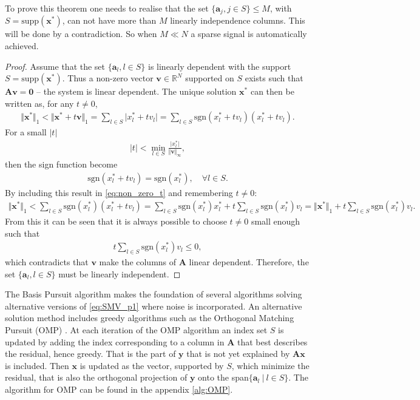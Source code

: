 To prove this theorem one needs to realise that the set $\lbrace \mathbf{a}_j, j \in S \rbrace \leq M$, with $S = \text{supp}(\mathbf{x}^\ast)$, can not have more than $M$ linearly independence columns. This will be done by a contradiction.
So when $M \ll N$ a sparse signal is automatically achieved.
\begin{proof}
Assume that the set $\lbrace \mathbf{a}_l, l \in S \rbrace$ is linearly dependent with the support $S = \text{supp}(\mathbf{x}^\ast)$.
Thus a non-zero vector $\mathbf{v} \in \mathbb{R}^N$ supported on $S$ exists such that $\mathbf{Av} = \textbf{0}$ -- the system is linear dependent. The unique solution $\mathbf{x}^\ast$ can then be written as, for any $t \neq 0$,
\begin{align}\label{eq:non_zero_t}
\Vert \mathbf{x}^\ast \Vert_1 < \Vert \mathbf{x}^\ast + t \mathbf{v} \Vert_1 = \sum_{l \in S} \vert x_l^\ast + t v_l \vert = \sum_{l \in S} \text{sgn}(x_l^\ast + t v_l )(x_l^\ast + t v_l ).
\end{align}
For a small $|t|$
\begin{align*}
|t| < \min_{l \in S} \frac{\vert x_l^\ast \vert}{\Vert \mathbf{v} \Vert_{\infty}},
\end{align*}
then the sign function become
\begin{align*}
\text{sgn}(x_l^\ast + t v_l) = \text{sgn}(x_l^\ast), \quad \forall l \in S.
\end{align*}
By including this result in \eqref{eq:non_zero_t} and remembering $t \neq 0$:
\begin{align*}
\Vert \textbf{x}^{\ast} \Vert_1 < \sum_{l \in S} \text{sgn}(x_l^{\ast})(x_l^{\ast} + t v_l ) = \sum_{l \in S} \text{sgn}(x_l^{\ast})x_l^{\ast} + t \sum_{l \in S} \text{sgn}(x_l^{\ast})v_l = \Vert \textbf{x}^{\ast} \Vert_1 + t \sum_{l \in S} \text{sgn}(x_l^{\ast})v_l.
\end{align*}
From this it can be seen that it is always possible to choose $t \neq 0$ small enough such that 
\begin{align*}
t \sum_{l \in S} \text{sgn}(x_l^\ast)v_l \leq 0,
\end{align*}
which contradicts that $\mathbf{v}$ make the columns of $\mathbf{A}$ linear dependent. 
Therefore, the set $\lbrace \mathbf{a}_l, l \in S \rbrace$ must be linearly independent.
\end{proof}
The Basis Pursuit algorithm makes the foundation of several algorithms solving alternative versions of \eqref{eq:SMV_p1} where noise is incorporated. 
An alternative solution method includes greedy algorithms such as the Orthogonal Matching Pursuit (OMP) \cite[P. 65]{FR}. 
At each iteration of the OMP algorithm an index set $S$ is updated by adding the index corresponding to a column in $\mathbf{A}$ that best describes the residual, hence greedy.
That is the part of $\mathbf{y}$ that is not yet explained by $\mathbf{Ax}$ is included. 
Then $\mathbf{x}$ is updated as the vector, supported by $S$, which minimize the residual, that is also the orthogonal projection of $\mathbf{y}$ onto the span$\lbrace \mathbf{a}_l \ \vert \ l \in S \rbrace$. The algorithm for OMP can be found in the appendix \ref{alg:OMP}.
